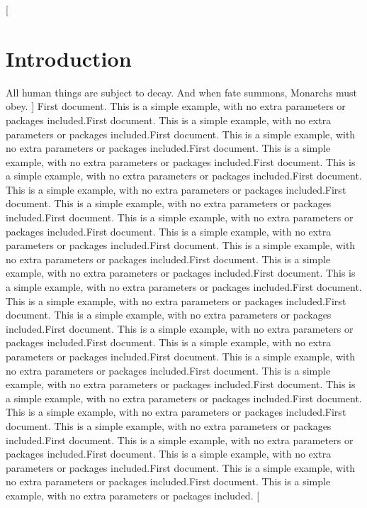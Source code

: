 \documentclass{article}
\begin{document}
\begin{multicols}{2}

[
\section{Introduction}
All human things are subject to decay. And when fate summons, Monarchs must obey.
]
First document. This is a simple example, with no 
extra parameters or packages included.First document. This is a simple example, with no 
extra parameters or packages included.First document. This is a simple example, with no 
extra parameters or packages included.First document. This is a simple example, with no 
extra parameters or packages included.First document. This is a simple example, with no 
extra parameters or packages included.First document. This is a simple example, with no 
extra parameters or packages included.First document. This is a simple example, with no 
extra parameters or packages included.First document. This is a simple example, with no 
extra parameters or packages included.First document. This is a simple example, with no 
extra parameters or packages included.First document. This is a simple example, with no 
extra parameters or packages included.First document. This is a simple example, with no 
extra parameters or packages included.First document. This is a simple example, with no 
extra parameters or packages included.First document. This is a simple example, with no 
extra parameters or packages included.First document. This is a simple example, with no 
extra parameters or packages included.First document. This is a simple example, with no 
extra parameters or packages included.First document. This is a simple example, with no 
extra parameters or packages included.First document. This is a simple example, with no 
extra parameters or packages included.First document. This is a simple example, with no 
extra parameters or packages included.First document. This is a simple example, with no 
extra parameters or packages included.First document. This is a simple example, with no 
extra parameters or packages included.First document. This is a simple example, with no 
extra parameters or packages included.First document. This is a simple example, with no 
extra parameters or packages included.First document. This is a simple example, with no 
extra parameters or packages included.First document. This is a simple example, with no 
extra parameters or packages included.First document. This is a simple example, with no 
extra parameters or packages included.
[

\end{multicols}
\end{document}
